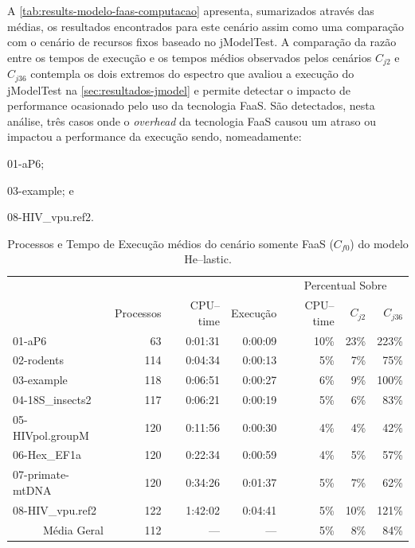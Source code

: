 \documentclass[english,brazilian]{UNISINOSmonografia} %
\begin{document}
A \autoref{tab:results-modelo-faas-computacao} apresenta, sumarizados através das médias, os resultados encontrados para este cenário assim como uma comparação com o cenário de recursos fixos baseado no jModelTest.
%
A comparação da razão entre os tempos de execução e os tempos médios observados pelos cenários $C_{j2}$ e $C_{j36}$ contempla os dois extremos do espectro que avaliou a execução do jModelTest na \autoref{sec:resultados-jmodel} e permite detectar o impacto de performance ocasionado pelo uso da tecnologia FaaS.
%
São detectados, nesta análise, três casos onde o \textit{overhead} da tecnologia FaaS causou um atraso ou impactou a performance da execução sendo, nomeadamente: 
\begin{inparaenum} 
	\item 01-aP6;
	\item 03-example; e
	\item 08-HIV\_vpu.ref2.
\end{inparaenum}


\begin{table}[tb]
	\centering%
	\begin{minipage}{\textwidth}
		\caption{Processos e Tempo de Execução médios do cenário somente FaaS ($C_{f0}$) do modelo \textsf{He}--lastic.}
		\label{tab:results-modelo-faas-computacao}
		\vspace{1ex}
		\begin{tabularx}{\textwidth}{@{\extracolsep{\fill}}lrrrrrr@{}}
			\toprule
			&  &  &  & \multicolumn{3}{c}{Percentual Sobre} \\ \cmidrule(l){5-7} 
			& Processos & CPU--time & Execução & CPU--time & $C_{j2}$ & $C_{j36}$ \\ \midrule
			01-aP6 & 63 & 0:01:31 & 0:00:09 & 10\% & 23\% & 223\% \\
			02-rodents & 114 & 0:04:34 & 0:00:13 & 5\% & 7\% & 75\% \\
			03-example & 118 & 0:06:51 & 0:00:27 & 6\% & 9\% & 100\% \\
			04-18S\_insects2 & 117 & 0:06:21 & 0:00:19 & 5\% & 6\% & 83\% \\
			05-HIVpol.groupM & 120 & 0:11:56 & 0:00:30 & 4\% & 4\% & 42\% \\
			06-Hex\_EF1a & 120 & 0:22:34 & 0:00:59 & 4\% & 5\% & 57\% \\
			07-primate-mtDNA & 120 & 0:34:26 & 0:01:37 & 5\% & 7\% & 62\% \\
			08-HIV\_vpu.ref2 & 122 & 1:42:02 & 0:04:41 & 5\% & 10\% & 121\% \\
			\bottomrule
			\multicolumn{1}{r}{Média Geral} & 112 & --- & --- & 5\% & 8\% & 84\% \\ 
		\end{tabularx}
	\end{minipage}
\end{table}
\end{document}
